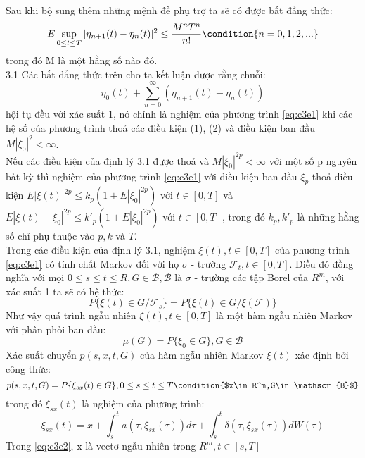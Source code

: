 \documentclass[a4paper]{article}
\numberwithin{equation}{section}
\begin{document}
Sau khi bộ sung thêm những mệnh đề phụ trợ ta sẽ có được bất đẳng thức:
\begin{equation*}
	E\sup_{0\leq t\leq T}|\eta_{n+1}(t)-\eta_n(t)|^2\leq\frac{M^nT^n}{n!} \condition{n=0,1,2,...}
\end{equation*}
trong đó M là một hằng số nào đó.\\3.1
Các bất đẳng thức trên cho ta kết luận được rằng chuỗi:
\begin{equation*}
	\eta_0(t)+\sum_{n=0}^\infty(\eta_{n+1}(t)-\eta_n(t))
\end{equation*}
hội tụ đều với xác suất 1, nó chính là nghiệm của phương trình \eqref{eq:c3e1} khi các hệ số của phương trình thoả các điều kiện (1), (2) và điều kiện ban đầu $M|\xi_0|^2<\infty$.\\
Nếu các điều kiện của định lý 3.1 được thoả và $M|\xi_0|^{2p}<\infty$ với một số p nguyên bất kỳ thì nghiệm của phương trình \eqref{eq:c3e1} với điều kiện ban đầu $\xi_p$ thoả điều kiện $E|\xi(t)|^{2p}\leq k_p(1+E|\xi_0|^{2p})$ với $t\in[0,T]$ và $E|\xi(t)-\xi_0|^{2p}\leq k'_p(1+E|\xi_0|^{2p})$ với $t\in[0,T]$, trong đó $k_p,k'_p$ là những hằng số chỉ phụ thuộc vào $p,k$ và $T$.\\
Trong các điều kiện của định lý 3.1, nghiệm $\xi(t),t\in[0,T]$ của phương trình \eqref{eq:c3e1} có tính chất Markov đối với họ $\sigma$ - trường ${\mathscr{F}_t,t\in[0,T]}$. Điều đó đồng nghĩa với mọi $0\leq s\leq t\leq R,G\in \mathscr{B},\mathscr{B}$ là $\sigma$ - trường các tập Borel của $R^m$, với xác suất 1 ta sẽ có hệ thức:
\begin{equation*}
	P\{\xi(t)\in G/\mathscr{F}_s\}=P\{\xi(t)\in G/\xi(\mathscr{F})\}
\end{equation*}
Như vậy quá trình ngẫu nhiên $\xi(t),t\in[0,T]$ là một hàm ngẫu nhiên Markov với phân phối ban đầu:
\begin{equation*}
	\mu(G)=P\{\xi_0\in G\},G\in \mathscr{B}
\end{equation*}
Xác suất chuyển $p(s,x,t,G)$ của hàm ngẫu nhiên Markov $\xi(t)$ xác định bởi công thức:
\begin{equation*}
	p(s,x,t,G)=P\{\xi_{sx}(t)\in G\},0\leq s\leq t\leq T \condition{$x\in R^m,G\in\mathscr{B}$}
\end{equation*}
trong đó $\xi_{sx}(t)$ là nghiệm của phương trình:
\begin{equation}\label{eq:c3e2}
	\xi_{sx}(t)=x+\int_{s}^{t}a(\tau,\xi_{sx}(\tau))d\tau+\int_{s}^{t}\delta(\tau,\xi_{sx}(\tau))dW(\tau)
\end{equation}
Trong \eqref{eq:c3e2}, x là vectơ ngẫu nhiên trong $R^m,t\in[s,T]$\\
\end{document}
